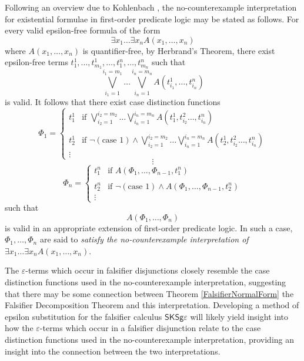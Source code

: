\documentclass[10pt]{article}
\theoremstyle{definition}\newtheorem{remark}[theorem]{Remark}
\theoremstyle{definition}\newtheorem{example}[theorem]{Example}
\theoremstyle{definition}\newtheorem{definition}[theorem]{Definition}
\newcommand{\FalsifierCalculus}{{\mathsf{SKSg\varepsilon}}}
\begin{document}
	Following an overview due to Kohlenbach \cite{KohlenbachNoCounterexample}, the no-counterexample interpretation for existential formulae in first-order predicate logic may be stated as follows. For every valid epsilon-free formula of the form
	\[
		\exists x_1 \dots \exists x_n A(x_1, \dots, x_n)
	\]
	where $A(x_1, \dots, x_n)$ is quantifier-free, by Herbrand's Theorem, there exist epsilon-free terms $t_1^1, \dots, t_{m_1}^1, \dots, t_1^n, \dots, t_{m_n}^n$ such that
	\[
		\bigvee_{i_1 = 1}^{i_1 = m_1} \dots \bigvee_{i_n = 1}^{i_n = m_n} A(t_{i_1}^1, \dots, t_{i_n}^n)
	\]
	is valid. It follows that there exist case distinction functions
	\[
		\Phi_1 = \begin{cases}
			t_1^1 & \text{if } \bigvee\limits_{i_2 = 1}^{i_2 = m_2} \dots \bigvee\limits_{i_n = 1}^{i_n = m_n} A(t_1^1, t_{i_2}^2 \dots, t_{i_n}^n) \\ \\
			t_2^1 & \text{if } \neg (\text{case 1}) \land \bigvee\limits_{i_2 = 1}^{i_2 = m_2} \dots \bigvee\limits_{i_n = 1}^{i_n = m_n} A(t_2^1, t_{i_2}^2 \dots, t_{i_n}^n) \\
			\vdots
		\end{cases}
	\]
	\[
		\vdots
	\]
	\[
		\Phi_n = \begin{cases}
			t_1^n & \text{if } A(\Phi_1, \dots, \Phi_{n - 1}, t_1^n) \\ \\
			t_2^n & \text{if } \neg (\text{case 1}) \land A(\Phi_1, \dots, \Phi_{n - 1}, t_2^n) \\
			\vdots
		\end{cases}
	\]
	such that
	\[
		A(\Phi_1, \dots, \Phi_n)
	\]
	is valid in an appropriate extension of first-order predicate logic. In such a case, $\Phi_1, \dots, \Phi_n$ are said to \textit{satisfy the no-counterexample interpretation of $\exists x_1 \dots \exists x_n A(x_1, \dots, x_n)$}.
	
	The $\varepsilon$-terms which occur in falsifier disjunctions closely resemble the case distinction functions used in the no-counterexample interpretation, suggesting that there may be some connection between Theorem \ref{FalsifierNormalForm} the Falsifier Decomposition Theorem and this interpretation. Developing a method of epsilon substitution for the falsifier calculus $\FalsifierCalculus$ will likely yield insight into how the $\varepsilon$-terms which occur in a falsifier disjunction relate to the case distinction functions used in the no-counterexample interpretation, providing an insight into the connection between the two interpretations.
	
\end{document}
